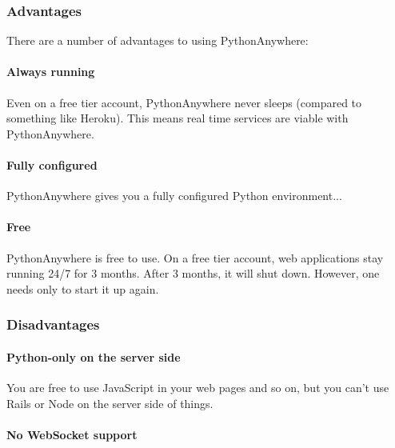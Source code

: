 \subsubsection{Advantages}
There are a number of advantages to using PythonAnywhere:

\paragraph{Always running}
Even on a free tier account, PythonAnywhere never sleeps (compared to something like Heroku). This means real time services are viable with PythonAnywhere.

\paragraph{Fully configured}
PythonAnywhere gives you a fully configured Python environment...

\paragraph{Free}
PythonAnywhere is free to use. On a free tier account, web applications stay running 24/7 for 3 months. After 3 months, it will shut down. However, one needs only to start it up again.

\subsubsection{Disadvantages}

\paragraph{Python-only on the server side}
You are free to use JavaScript in your web pages and so on, but you can't use Rails or Node on the server side of things.

\paragraph{No WebSocket support}